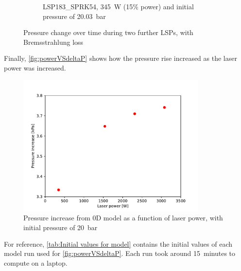 \begin{figure}[!ht]
\begin{subfigure}[t]{0.45\textwidth}
                \caption{LSP183\_SPRK54, \qty{345}{W} (15\% power) and initial pressure of \qty{20.03}{bar}}
            \end{subfigure}
            \caption{Pressure change over time during two further LSPs, with Bremsstrahlung loss}
            \label{fig:Two further LSPs}
        \end{figure}

        Finally, \autoref{fig:powerVSdeltaP} shows how the pressure rise increased as the laser power was increased.

        \begin{figure}[!ht]
            \centering
            \includegraphics[width=0.85\textwidth]{assets/2 models/powerVSdeltaP.pdf}
            \caption{Pressure increase from 0D model as a function of laser power, with initial pressure of \qty{20}{bar}}
            \label{fig:powerVSdeltaP}
        \end{figure}

        For reference, \autoref{tab:Initial values for model} contains the initial values of each model run used for \autoref{fig:powerVSdeltaP}. Each run took around \qty{15}{minutes} to compute on a laptop.


